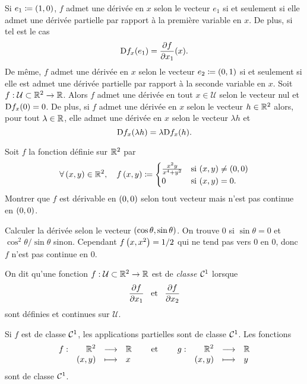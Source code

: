 \documentclass{magnolia}
\begin{document}
\begin{remarques}
\remarque Si $e_1\coloneqq(1,0)$, $f$ admet une dérivée en $x$
  selon le vecteur $e_1$ si et seulement si elle admet une dérivée partielle par rapport à la
  première variable en $x$. De plus, si tel est le cas
  \[{\rm D}f_{x}(e_1)=\frac{\partial f}{\partial x_1}(x).\]
  De même, $f$ admet une dérivée en $x$ selon le vecteur $e_2\coloneqq(0,1)$ si et seulement
  si elle est admet une dérivée partielle par rapport à la seconde variable en $x$.
\remarque Soit $f:\mathcal{U}\subset\mathbb{R}^2\to\mathbb{R}$. Alors $f$ admet une dérivée en tout
  $x\in\mathcal{U}$ selon le vecteur nul et ${\rm D}f_x(0)=0$.
  De plus, si $f$ admet une dérivée en $x$ selon le vecteur $h\in\mathbb{R}^2$ alors, pour tout
  $\lambda\in\mathbb{R}$, elle admet une dérivée en $x$ selon le vecteur $\lambda h$
  et
  \[{\rm D}f_x(\lambda h)=\lambda {\rm D}f_x(h).\]
\end{remarques}

\begin{exoUnique}
\exo Soit $f$ la fonction définie sur $\mathbb{R}^2$ par
  \[\forall\left(x,y\right)\in\mathbb{R}^2 ,\quad f\left(x,y\right)\coloneqq
    \begin{cases}
    \frac{x^2 y}{x^4+y^2} & \text{si $\left(x,y\right)\neq\left(0,0\right)$}\\
    0 & \text{si $\left(x,y\right)=0$.}
    \end{cases}\]
  Montrer que $f$ est dérivable en $\left(0,0\right)$ selon tout vecteur mais n'est pas
  continue en $\left(0,0\right)$.
  \begin{sol}
  Calculer la dérivée selon le vecteur $\left(\cos\theta,\sin\theta\right)$. On trouve
  0 si $\sin\theta=0$ et $\cos^2 \theta/\sin\theta$ sinon. Cependant
  $f\left(x,x^2\right)=1/2$ qui ne tend pas vers 0 en 0, donc $f$ n'est pas continue
  en 0.
  \end{sol}
\end{exoUnique}

\begin{definition}
On dit qu'une fonction $f:\mathcal{U}\subset\mathbb{R}^2\to\mathbb{R}$ est de \emph{classe
$\mathcal{C}^{1}$} lorsque
\[\frac{\partial f}{\partial x_1} \quad\!\text{et}\quad\! \frac{\partial f}{\partial x_2}\]
sont définies et continues sur $\mathcal{U}$.
\end{definition}

\begin{remarques}
\remarque Si $f$ est de classe $\mathcal{C}^{1}$, les applications partielles
  sont de classe $\mathcal{C}^{1}$.
\remarque Les fonctions
  \[\begin{array}[t]{lrcl} \displaystyle{f} : & \displaystyle{\mathbb{R}^2} & \longrightarrow & \displaystyle{\mathbb{R}} \\ & \displaystyle{(x,y)} & \longmapsto & \displaystyle{x} \end{array} \quad\quad\!\text{et}\quad\!\quad
    \begin{array}[t]{lrcl} \displaystyle{g} : & \displaystyle{\mathbb{R}^2} & \longrightarrow & \displaystyle{\mathbb{R}} \\ & \displaystyle{(x,y)} & \longmapsto & \displaystyle{y} \end{array}\]
  sont de classe $\mathcal{C}^{1}$.
\end{remarques}
\end{document}
